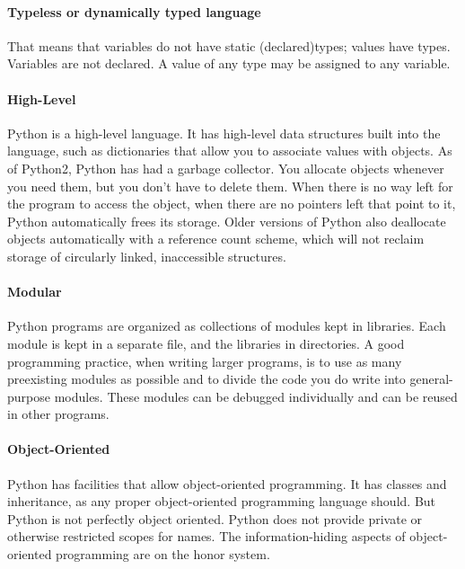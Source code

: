 \paragraph{Typeless or dynamically typed language} That means that variables do not have
static (declared)types; values have types. Variables are not declared. A value of any
type may be assigned to any variable.

\paragraph{High-Level}
Python is a high-level language. It
has high-level data structures built into the language, such as
dictionaries that allow you to associate values with objects. As of
Python2, Python has had a garbage collector. You allocate objects
whenever you need them, but you don't have to delete them. When there is
no way left for the program to access the object, when there are no
pointers left that point to it, Python automatically frees its storage.
Older versions of Python also deallocate objects automatically with a
reference count scheme, which will not reclaim storage of circularly
linked, inaccessible structures.

\paragraph{Modular}
Python programs are organized as
collections of modules kept in libraries. Each module is kept in a
separate file, and the libraries in directories. A good programming
practice, when writing larger programs, is to use as many preexisting
modules as possible and to divide the code you do write into
general-purpose modules. These modules can be debugged individually and
can be reused in other programs.


\paragraph{Object-Oriented}
Python has facilities that allow
object-oriented programming. It has classes and inheritance, as any
proper object-oriented programming language should. But Python is not
perfectly object oriented. Python does not provide private or otherwise
restricted scopes for names. The information-hiding aspects of
object-oriented programming are on the honor system.

